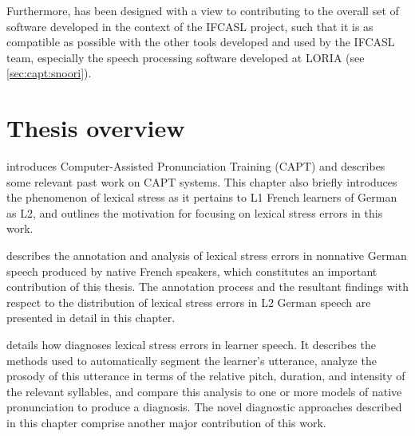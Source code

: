 Furthermore, 
 has been designed with a view to contributing to the overall set of software developed in the context of the IFCASL project, such that it is as compatible as possible with the other tools developed and used by the IFCASL team, especially the  speech processing software developed at LORIA (see \cref{sec:capt:snoori}).




\section{Thesis overview}
\label{sec:intro:overview}


 introduces Computer-Assisted Pronunciation Training (CAPT) 
and describes some relevant past work on CAPT systems. 
This chapter also briefly 
introduces the phenomenon of lexical stress as it pertains to L1 French learners of German as L2, and outlines
the motivation for focusing on lexical stress errors in this work.


describes 
the annotation and analysis of lexical stress errors in 
nonnative German speech produced by native French speakers, which constitutes an important contribution of this thesis. 
The annotation process and the resultant findings with respect to the distribution of lexical stress errors in L2 German speech are presented in detail in this chapter.

 details how  diagnoses lexical stress errors in learner speech. It describes the methods used to automatically segment the learner's utterance, analyze the prosody of this utterance in terms of the relative pitch, duration, and intensity of the relevant syllables, and compare this analysis to one or more models of native pronunciation to produce a diagnosis. The novel diagnostic approaches described in this chapter comprise another major contribution of this work. 

